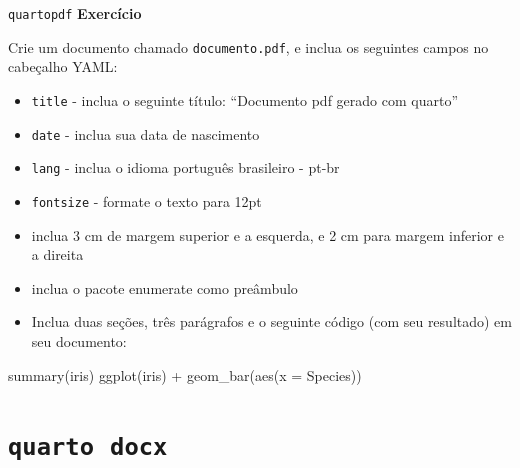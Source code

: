 \documentclass[
  10pt,
  ignorenonframetext,
]{beamer}
\newenvironment{Shaded}{\begin{snugshade}}{\end{snugshade}}
\newcommand{\AttributeTok}[1]{\textcolor[rgb]{0.40,0.45,0.13}{#1}}
\newcommand{\FunctionTok}[1]{\textcolor[rgb]{0.28,0.35,0.67}{#1}}
\newcommand{\NormalTok}[1]{\textcolor[rgb]{0.00,0.23,0.31}{#1}}
\newcommand{\SpecialCharTok}[1]{\textcolor[rgb]{0.37,0.37,0.37}{#1}}
\providecommand{\tightlist}{%
  \setlength{\itemsep}{0pt}\setlength{\parskip}{0pt}}\usepackage{longtable,booktabs,array}
\begin{document}
\begin{frame}[fragile]{\texttt{quarto}\newline \texttt{pdf}}
\protect\hypertarget{quartopdf-4}{}
\textbf{Exercício}

Crie um documento chamado \texttt{documento.pdf}, e inclua os seguintes
campos no cabeçalho YAML:

\begin{itemize}
\tightlist
\item
  \texttt{title} - inclua o seguinte título: ``Documento pdf gerado com
  quarto''
\item
  \texttt{date} - inclua sua data de nascimento
\item
  \texttt{lang} - inclua o idioma português brasileiro - pt-br
\item
  \texttt{fontsize} - formate o texto para 12pt
\item
  inclua 3 cm de margem superior e a esquerda, e 2 cm para margem
  inferior e a direita
\item
  inclua o pacote enumerate como preâmbulo
\item
  Inclua duas seções, três parágrafos e o seguinte código (com seu
  resultado) em seu documento:
\end{itemize}

\begin{Shaded}
\begin{Highlighting}[]
\FunctionTok{summary}\NormalTok{(iris)}
\FunctionTok{ggplot}\NormalTok{(iris) }\SpecialCharTok{+} \FunctionTok{geom\_bar}\NormalTok{(}\FunctionTok{aes}\NormalTok{(}\AttributeTok{x =}\NormalTok{ Species))}
\end{Highlighting}
\end{Shaded}
\end{frame}

\hypertarget{quarto-docx}{%
\section{\texorpdfstring{\texttt{quarto}\newline\newline~\texttt{docx}}{quarto~docx}}\label{quarto-docx}}
\end{document}
